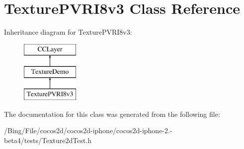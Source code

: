 \hypertarget{interface_texture_p_v_r_i8v3}{\section{Texture\-P\-V\-R\-I8v3 Class Reference}
\label{interface_texture_p_v_r_i8v3}
}
Inheritance diagram for Texture\-P\-V\-R\-I8v3\-:\begin{figure}[H]
\begin{center}
\leavevmode
\includegraphics[height=3.000000cm]{interface_texture_p_v_r_i8v3}
\end{center}
\end{figure}


The documentation for this class was generated from the following file\-:\begin{DoxyCompactItemize}
\item 
/\-Bing/\-File/cocos2d/cocos2d-\/iphone/cocos2d-\/iphone-\/2.-\/beta4/tests/Texture2d\-Test.\-h\end{DoxyCompactItemize}
